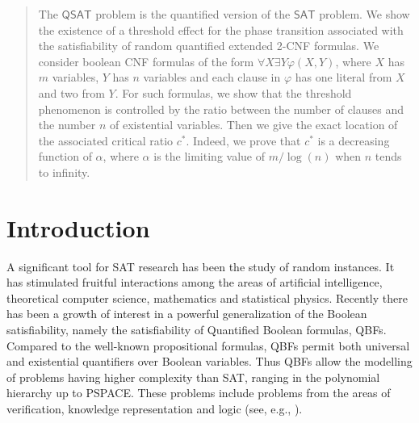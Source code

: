 \documentclass[aop,noinfoline]{imsart}
\newcommand{\sat}{\mathsf{SAT}}
\newcommand{\qsat}{\mathsf{
QSAT}}
\begin{document}
\begin{frontmatter}
\begin{abstract}

The $\qsat$ problem is the quantified version of the $\sat$ problem.
We show the existence of a threshold effect for the phase transition
associated with the satisfiability of random quantified extended 2-CNF
formulas. We consider boolean CNF formulas of the form $\forall X
\exists Y \varphi(X,Y)$, where $X$ has $m$ variables, $Y$ has $n$
variables and each clause in $\varphi$ has one literal from $X$ and
two from $Y$. For such formulas, we show that the threshold
phenomenon is controlled by the ratio between the number of clauses
and the number $n$ of existential variables. Then we give the exact
location of the associated critical ratio $c^{*}$.  Indeed, we prove
that $c^{*}$ is a decreasing function of $ \alpha$, where $\alpha$ is
the limiting value of $m / \log (n)$ when $n$ tends to infinity. 



\end{abstract}


\begin{keyword}[class=AMS]
\end{keyword}

\begin{keyword}
\end{keyword}

\end{frontmatter}






\section{Introduction}\label{sec:introduction}




A significant tool for SAT research has been the study of random
instances.  It has stimulated fruitful interactions among the areas
of artificial intelligence, theoretical computer science,
mathematics and statistical physics. Recently there has been a
growth of interest in a powerful generalization of the Boolean
satisfiability, namely the satisfiability of Quantified Boolean
formulas, QBFs.  Compared to the well-known propositional
formulas, QBFs permit both universal and existential quantifiers
over Boolean variables. Thus QBFs allow  the modelling of problems
having higher complexity than SAT, ranging in the polynomial
hierarchy up to PSPACE. These problems include problems from the
areas of verification, knowledge representation and logic (see,
e.g., \cite{Egly00c}).
\end{document}
